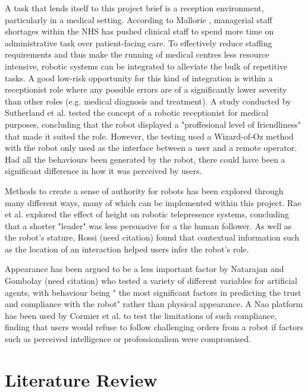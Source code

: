 \documentclass[conference]{IEEEtran}
\begin{document}
A task that lends itself to this project brief is a reception environment, particularly in a medical setting. According to 
Mallorie \cite{mallorie2024}, managerial staff shortages within the NHS has pushed clinical staff to spend more time on administrative task over 
patient-facing care. To effectively reduce staffing requirements and thus make the running of medical centres less resource intensive, robotic 
systems can be integrated to alleviate the bulk of repetitive tasks. A good low-risk opportunity for this kind of integration is within a 
receptionist role where any possible errors are of a significantly lower severity than other roles (e.g. medical diagnosis and treatment).
A study conducted by Sutherland et al. \cite{Sutherland2019} tested the concept of a robotic receptionist for medical purposes, concluding that the robot displayed a 
"proffesional level of friendliness" that made it suited the role. However, the testing used a Wizard-of-Oz method with the robot only 
used as the interface between a user and a remote operator. Had all the behaviours been generated by the robot, there could have been 
a significant difference in how it was perceived by users.

Methods to create a sense of authority for robots has been explored through many different ways, many of which can be implemented within 
this project. Rae et al. \cite{Rae2013} explored the effect of height on robotic telepresence systems, concluding that a shorter "leader" was less persuasive 
for a the human follower. As well as the robot's stature, Rossi (need citation) found that contextual information such as the location of an interaction 
helped users infer the robot’s role.

Appearance has been argued to be a less important factor by Natarajan and Gombolay (need citation) who tested a variety of different variables for artificial agents, with 
behaviour being " the most significant factors in predicting the trust and compliance with the robot" rather 
than physical appearance. A Nao platform has been used by Cormier et al. \cite{cormier2013} to test the limitations of such compliance, finding that users would 
refuse to follow challenging orders from a robot if factors such as perceived intelligence or professionalism were compromised.


\section{Literature Review}
\end{document}
